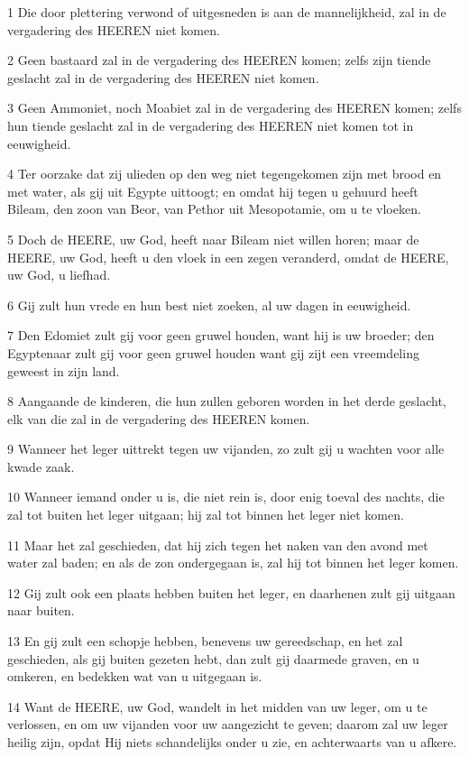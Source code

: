 \par 1 Die door plettering verwond of uitgesneden is aan de mannelijkheid, zal in de vergadering des HEEREN niet komen.
\par 2 Geen bastaard zal in de vergadering des HEEREN komen; zelfs zijn tiende geslacht zal in de vergadering des HEEREN niet komen.
\par 3 Geen Ammoniet, noch Moabiet zal in de vergadering des HEEREN komen; zelfs hun tiende geslacht zal in de vergadering des HEEREN niet komen tot in eeuwigheid.
\par 4 Ter oorzake dat zij ulieden op den weg niet tegengekomen zijn met brood en met water, als gij uit Egypte uittoogt; en omdat hij tegen u gehuurd heeft Bileam, den zoon van Beor, van Pethor uit Mesopotamie, om u te vloeken.
\par 5 Doch de HEERE, uw God, heeft naar Bileam niet willen horen; maar de HEERE, uw God, heeft u den vloek in een zegen veranderd, omdat de HEERE, uw God, u liefhad.
\par 6 Gij zult hun vrede en hun best niet zoeken, al uw dagen in eeuwigheid.
\par 7 Den Edomiet zult gij voor geen gruwel houden, want hij is uw broeder; den Egyptenaar zult gij voor geen gruwel houden want gij zijt een vreemdeling geweest in zijn land.
\par 8 Aangaande de kinderen, die hun zullen geboren worden in het derde geslacht, elk van die zal in de vergadering des HEEREN komen.
\par 9 Wanneer het leger uittrekt tegen uw vijanden, zo zult gij u wachten voor alle kwade zaak.
\par 10 Wanneer iemand onder u is, die niet rein is, door enig toeval des nachts, die zal tot buiten het leger uitgaan; hij zal tot binnen het leger niet komen.
\par 11 Maar het zal geschieden, dat hij zich tegen het naken van den avond met water zal baden; en als de zon ondergegaan is, zal hij tot binnen het leger komen.
\par 12 Gij zult ook een plaats hebben buiten het leger, en daarhenen zult gij uitgaan naar buiten.
\par 13 En gij zult een schopje hebben, benevens uw gereedschap, en het zal geschieden, als gij buiten gezeten hebt, dan zult gij daarmede graven, en u omkeren, en bedekken wat van u uitgegaan is.
\par 14 Want de HEERE, uw God, wandelt in het midden van uw leger, om u te verlossen, en om uw vijanden voor uw aangezicht te geven; daarom zal uw leger heilig zijn, opdat Hij niets schandelijks onder u zie, en achterwaarts van u afkere.
